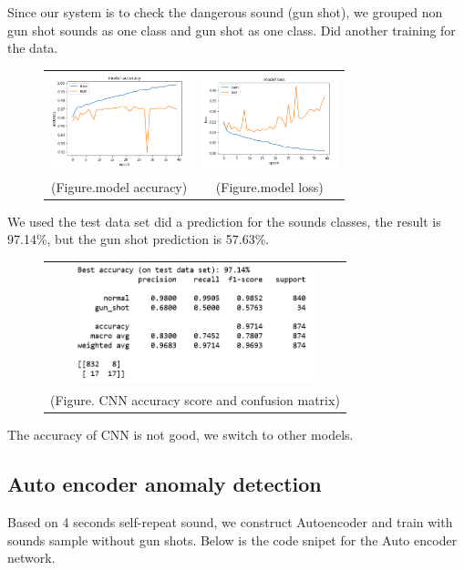 \documentclass{article}
\begin{document}
Since our system is to check the dangerous sound (gun shot), we grouped non gun shot sounds as one class and gun shot as one class. Did another training for the data.
\begin{figure}[!htb]
    \begin{tabular}{cc}
        \includegraphics[width=4cm]{pic/CNN_ACC_V2.png}
        &\includegraphics[width=4cm]{pic/CNN_Loss_V2.png}\\
    (Figure.model accuracy)&(Figure.model loss)
    \end{tabular}
\end{figure}
We used the test data set did a prediction for the sounds classes, the result is 97.14\%, but the gun shot prediction is 57.63\%.
\begin{figure}[!htb]
    \begin{tabular}{c}
        \includegraphics[width=7cm]{pic/CNN_Pm_V2.png}\\
    (Figure. CNN accuracy score and confusion matrix)
    \end{tabular}
\end{figure}
The accuracy of CNN is not good, we switch to other models.

\subsection{Auto encoder anomaly detection}
Based on 4 seconds self-repeat sound, we construct Autoencoder and train with sounds sample without gun shots. Below is the code snipet for the Auto encoder network.
\end{document}
